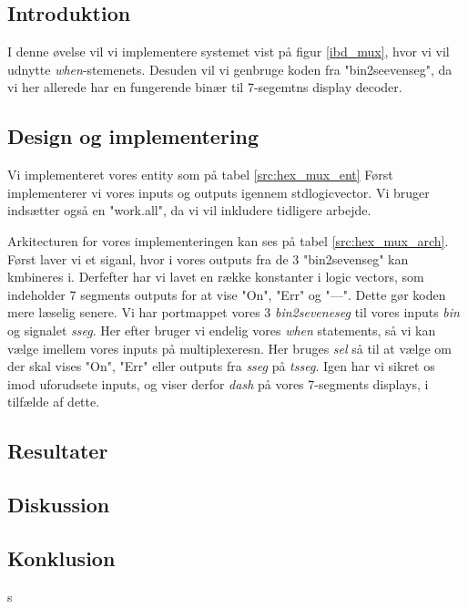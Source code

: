 \documentclass[../journal2.tex]{subfiles}
\begin{document}
\subsection{Introduktion}

I denne øvelse vil vi implementere systemet vist på figur \ref{ibd_mux}, hvor vi vil udnytte \textit{when}-stemenets. Desuden vil vi genbruge koden fra "bin2seevenseg", da vi her allerede har en fungerende binær til 7-segemtns display decoder.


\subsection{Design og implementering}

Vi implementeret vores entity som på tabel \ref{src:hex_mux_ent} Først implementerer vi vores inputs og outputs igennem std\textunderscore logic\textunderscore vector. Vi bruger indsætter også en "work.all", da vi vil inkludere tidligere arbejde.

\begin{table}[H]
    \centering
      \framebox{
        \rule{8pt}{0pt}
          
  }
  \caption{Entity af hex\textunderscore mux}
  \label{src:hex_mux_ent}
\end{table}

Arkitecturen for vores implementeringen kan ses på tabel \ref{src:hex_mux_arch}. Først laver vi et siganl, hvor i vores outputs fra de 3 "bin2sevenseg" kan kmbineres i. Derfefter har vi lavet en række konstanter i logic vectors, som indeholder 7 segments outputs for at vise "On", "Err" og "---". Dette gør koden mere læselig senere. Vi har portmappet vores 3 \textit{bin2seveneseg} til vores inputs \textit{bin} og signalet \textit{sseg}. Her efter bruger vi endelig vores \textit{when} statements, så vi kan vælge imellem vores inputs på multiplexeresn. Her bruges \textit{sel} så til at vælge om der skal vises "On", "Err" eller outputs fra \textit{sseg} på \textit{tsseg}. Igen har vi sikret os imod uforudsete inputs, og viser derfor \textit{dash} på vores 7-segments displays, i tilfælde af dette.

\begin{table}[H]
    \centering
      \framebox{
        \rule{8pt}{0pt}
          
  }
  \caption{Architecture af hex\textunderscore mux}
  \label{src:hex_mux_arch}
\end{table}
\subsection{Resultater}

\subsection{Diskussion}

\subsection{Konklusion}
s
\end{document}
